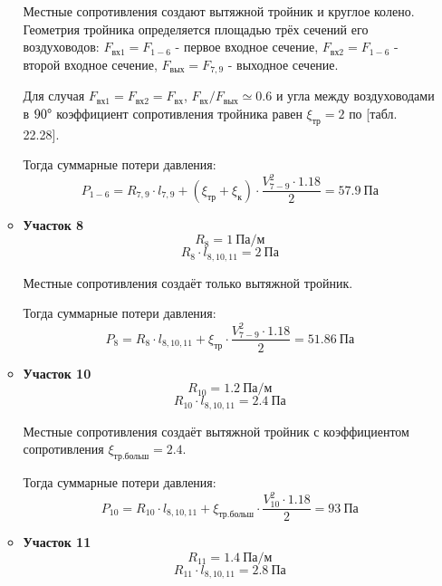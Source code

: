 \begin{enumerate}
\begin{itemize}
                    Местные сопротивления создают вытяжной тройник и круглое колено.
                    Геометрия тройника определяется площадью трёх сечений его воздуховодов:
                    $F_\text{вх1} = F_{1-6}$ - первое входное сечение,
                    $F_\text{вх2} = F_{1-6}$ - второй входное сечение,
                    $F_\text{вых} = F_{7,9}$ - выходное сечение.

                    Для случая $F_\text{вх1} = F_\text{вх2} = F_\text{вх}$,
                    $F_\text{вх} / F_\text{вых} \simeq 0.6$ и угла между воздуховодами
                    в $90 \degree$ коэффициент сопротивления
                    тройника равен $\xi_\text{тр} = 2$ по
                    \cite{air_ventilation_and_conditioning}[табл. 22.28].

                    Тогда суммарные потери давления:
                    $$
                        P_{1-6} = R_{7,9} \cdot l_{7,9}
                                    + (\xi_\text{тр} + \xi_\text{к}) \cdot \frac{V_{7-9}^2 \cdot 1.18}{2}
                                = 57.9 ~\text{Па}
                    $$

            \item   \textbf{Участок 8}
                    $$
                        R_{8} = 1 ~\text{Па/м}
                    $$
                    $$
                        R_{8} \cdot l_{8,10,11} = 2 ~\text{Па}
                    $$

                    Местные сопротивления создаёт только вытяжной тройник.

                    Тогда суммарные потери давления:
                    $$
                        P_{8} = R_{8} \cdot l_{8,10,11}
                                    + \xi_\text{тр} \cdot \frac{V_{7-9}^2 \cdot 1.18}{2}
                                = 51.86 ~\text{Па}
                    $$

            \item   \textbf{Участок 10}
                    $$
                        R_{10} = 1.2 ~\text{Па/м}
                    $$
                    $$
                        R_{10} \cdot l_{8,10,11} = 2.4 ~\text{Па}
                    $$

                    Местные сопротивления создаёт вытяжной тройник с коэффициентом
                    сопротивления $\xi_\text{тр.больш} = 2.4$.

                    Тогда суммарные потери давления:
                    $$
                        P_{10} = R_{10} \cdot l_{8,10,11}
                                    + \xi_\text{тр.больш} \cdot \frac{V_{10}^2 \cdot 1.18}{2}
                                = 93 ~\text{Па}
                    $$
            \item   \textbf{Участок 11}
                    $$
                        R_{11} = 1.4 ~\text{Па/м}
                    $$
                    $$
                        R_{11} \cdot l_{8,10,11} = 2.8 ~\text{Па}
                    $$


\end{itemize}
\end{enumerate}
